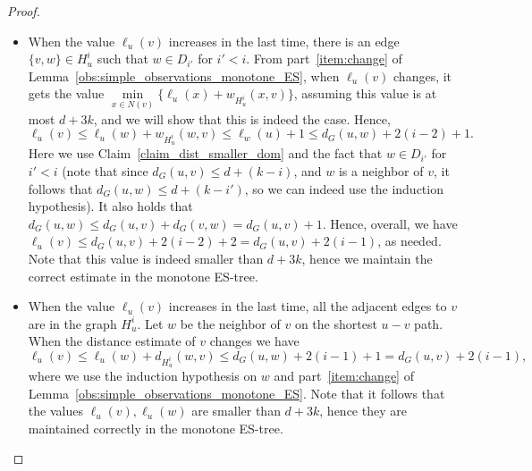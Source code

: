 \begin{proof}
\begin{itemize}
    \item [Case 1:] When the value $\ell_u(v)$ increases in the last time, there is an edge $\{v,w\} \in H_u^i$ such that $w \in D_{i'}$ for $i' < i$. 
    From part~\ref{item:change} of Lemma~\ref{obs:simple_observations_monotone_ES}, when $\ell_u(v)$ changes, it gets the value $\min\limits_{x\in N(v)} \{\ell_u(x)+w_{H_u^i}(x,v) \}$, assuming this value is at most $d+3k$, and we will show that this is indeed the case. Hence, $$\ell_u(v) \leq \ell_u(w)+w_{H^i_u}(w,v) \leq \ell_w(u) + 1 \leq d_G(u,w)+2(i-2)+1.$$ Here we use Claim~\ref{claim_dist_smaller_dom} and the fact that $w \in D_{i'}$ for $i' < i$ (note that since $d_G(u,v) \leq d+(k-i)$, and $w$ is a neighbor of $v$, it follows that $d_G(u,w) \leq d+(k-i')$, so we can indeed use the induction hypothesis). It also holds that $d_G(u,w) \leq d_G(u,v)+d_G(v,w)=d_G(u,v)+1$. Hence, overall, we have $\ell_u(v) \leq d_G(u,v) + 2(i-2)+2=d_G(u,v)+2(i-1)$, as needed. Note that this value is indeed smaller than $d+3k$, hence we maintain the correct estimate in the monotone ES-tree.
    \item [Case 2:] When the value $\ell_u(v)$ increases in the last time, all the adjacent edges to $v$ are in the graph $H_u^i$.
    Let $w$ be the neighbor of $v$ on the shortest $u-v$ path. When the distance estimate of $v$ changes we have $$\ell_u(v) \leq \ell_u(w)+d_{H_u^i}(w,v) \leq d_G(u,w) + 2(i-1) + 1 = d_G(u,v)+2(i-1),$$ where we use the induction hypothesis on $w$ and part~\ref{item:change} of Lemma~\ref{obs:simple_observations_monotone_ES}. Note that it follows that the values $\ell_u(v),\ell_u(w)$ are smaller than $d+3k$, hence they are maintained correctly in the monotone ES-tree.\qedhere
\end{itemize}
\end{proof}


